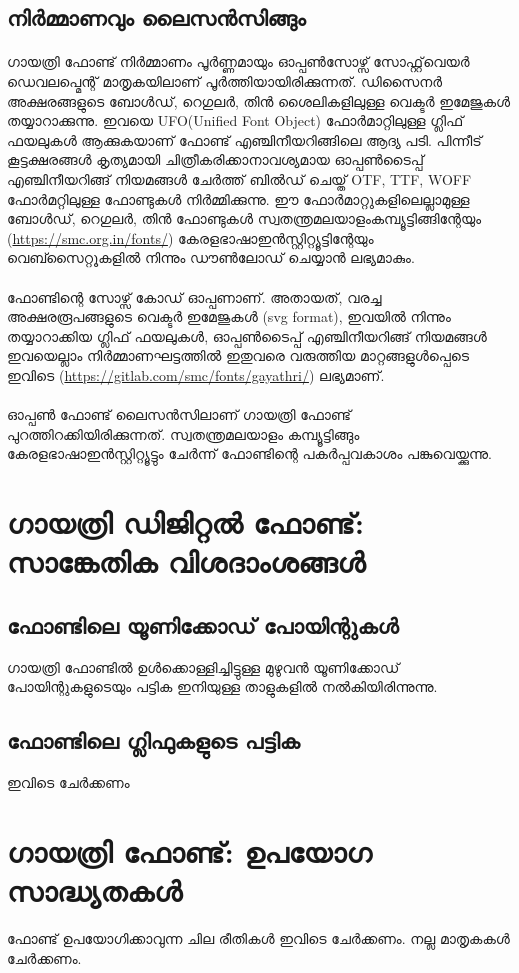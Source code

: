 \documentclass[12pt]{article}
\begin{document}
	\subsection{നിര്‍മ്മാണവും ലൈസന്‍സിങ്ങും}
	
	\paragraph{}
	ഗായത്രി ഫോണ്ട് നിര്‍മ്മാണം പൂര്‍ണ്ണമായും ഓപ്പണ്‍സോഴ്സ് സോഫ്റ്റ്‌വെയര്‍ ഡെവലപ്മെന്റ് മാതൃകയിലാണ് പൂര്‍ത്തിയായിരിക്കുന്നത്. ഡിസൈനര്‍ അക്ഷരങ്ങളുടെ ബോള്‍ഡ്, റെഗുലര്‍, തിന്‍ ശൈലികളിലുള്ള വെക്ടര്‍ ഇമേജുകള്‍ തയ്യാറാക്കുന്നു. ഇവയെ UFO(Unified Font Object) ഫോര്‍മാറ്റിലുള്ള ഗ്ലിഫ് ഫയലുകള്‍ ആക്കുകയാണ് ഫോണ്ട് എഞ്ചിനീയറിങ്ങിലെ ആദ്യ പടി. പിന്നീട് കൂട്ടക്ഷരങ്ങള്‍ കൃത്യമായി ചിത്രീകരിക്കാനാവശ്യമായ ഓപ്പണ്‍ടൈപ്പ് എഞ്ചിനീയറിങ്ങ് നിയമങ്ങള്‍ ചേര്‍ത്ത് ബില്‍ഡ് ചെയ്ത് OTF, TTF, WOFF ഫോര്‍മറ്റിലുള്ള ഫോണ്ടുകള്‍ നിര്‍മ്മിക്കുന്നു. ഈ ഫോര്‍മാറ്റുകളിലെല്ലാമുള്ള ബോള്‍ഡ്, റെഗുലര്‍, തിന്‍ ഫോണ്ടുകള്‍ സ്വതന്ത്രമലയാളംകമ്പ്യൂട്ടിങ്ങിന്റേയും (\url{https://smc.org.in/fonts/}) കേരളഭാഷാഇന്‍സ്റ്റിറ്റ്യൂട്ടിന്റേയും വെബ്സൈറ്റൂകളില്‍ നിന്നും ഡൗണ്‍ലോഡ് ചെയ്യാന്‍ ലഭ്യമാകും.
	
	\paragraph{}
	ഫോണ്ടിന്റെ സോഴ്സ് കോഡ് ഓപ്പണാണ്. അതായത്, വരച്ച അക്ഷരരൂപങ്ങളുടെ വെക്ടര്‍ ഇമേജുകള്‍ (svg format), ഇവയില്‍ നിന്നും തയ്യാറാക്കിയ ഗ്ലിഫ് ഫയലുകള്‍, ഓപ്പണ്‍ടൈപ്പ് എഞ്ചിനീയറിങ്ങ് നിയമങ്ങള്‍ ഇവയെല്ലാം നിര്‍മ്മാണഘട്ടത്തില്‍ ഇതുവരെ വരുത്തിയ മാറ്റങ്ങളുള്‍പ്പെടെ ഇവിടെ (\url{https://gitlab.com/smc/fonts/gayathri/}) ലഭ്യമാണ്.
	
	\paragraph{}
		ഓപ്പണ്‍ ഫോണ്ട് ലൈസന്‍സിലാണ് ഗായത്രി ഫോണ്ട് പുറത്തിറക്കിയിരിക്കുന്നത്. സ്വതന്ത്രമലയാളം കമ്പ്യൂട്ടിങ്ങും കേരളഭാഷാഇന്‍സ്റ്റിറ്റ്യൂട്ടും ചേര്‍ന്ന് ഫോണ്ടിന്റെ പകര്‍പ്പവകാശം പങ്കുവെയ്ക്കുന്നു.
	
	\section{ഗായത്രി ഡിജിറ്റല്‍ ഫോണ്ട്: സാങ്കേതിക വിശദാംശങ്ങള്‍}
	
	\subsection{ഫോണ്ടിലെ യൂണിക്കോഡ് പോയിന്റുകള്‍}
	ഗായത്രി ഫോണ്ടില്‍ ഉള്‍ക്കൊള്ളിച്ചിട്ടുള്ള മുഴുവന്‍ യൂണിക്കോഡ് പോയിന്റുകളുടെയും പട്ടിക ഇനിയുള്ള താളുകളില്‍ നല്‍കിയിരിന്നുന്നു.
	


	\subsection{ഫോണ്ടിലെ ഗ്ലിഫുകളുടെ പട്ടിക}
		ഇവിടെ ചേര്‍ക്കണം
	
	\section{ഗായത്രി ഫോണ്ട്: ഉപയോഗ സാദ്ധ്യതകള്‍}
	
	ഫോണ്ട് ഉപയോഗിക്കാവുന്ന ചില രീതികള്‍ ഇവിടെ ചേര്‍ക്കണം. നല്ല മാതൃകകള്‍ ചേര്‍ക്കണം.
	
	
	
\end{document}
